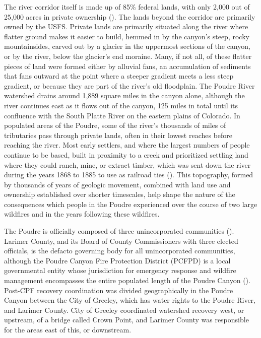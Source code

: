 \documentclass[
]{article}
\begin{document}
The river corridor itself is made up of 85\% federal lands, with only 2,000 out of 25,000 acres in private ownership (). The lands beyond the corridor are primarily owned by the USFS. Private lands are primarily situated along the river where flatter ground makes it easier to build, hemmed in by the canyon's steep, rocky mountainsides, carved out by a glacier in the uppermost sections of the canyon, or by the river, below the glacier's end moraine. Many, if not all, of these flatter pieces of land were formed either by alluvial fans, an accumulation of sediments that fans outward at the point where a steeper gradient meets a less steep gradient, or because they are part of the river's old floodplain. The Poudre River watershed drains around 1,889 square miles in the canyon alone, although the river continues east as it flows out of the canyon, 125 miles in total until its confluence with the South Platte River on the eastern plains of Colorado. In populated areas of the Poudre, some of the river's thousands of miles of tributaries pass through private lands, often in their lowest reaches before reaching the river. Most early settlers, and where the largest numbers of people continue to be based, built in proximity to a creek and prioritized settling land where they could ranch, mine, or extract timber, which was sent down the river during the years 1868 to 1885 to use as railroad ties (). This topography, formed by thousands of years of geologic movement, combined with land use and ownership established over shorter timescales, help shape the nature of the consequences which people in the Poudre experienced over the course of two large wildfires and in the years following these wildfires.

The Poudre is officially composed of three unincorporated communities (). Larimer County, and its Board of County Commissioners with three elected officials, is the defacto governing body for all unincorporated communities, although the Poudre Canyon Fire Protection District (PCFPD) is a local governmental entity whose jurisdiction for emergency response and wildfire management encompasses the entire populated length of the Poudre Canyon (). Post-CPF recovery coordination was divided geographically in the Poudre Canyon between the City of Greeley, which has water rights to the Poudre River, and Larimer County. City of Greeley coordinated watershed recovery west, or upstream, of a bridge called Crown Point, and Larimer County was responsible for the areas east of this, or downstream.
\end{document}

